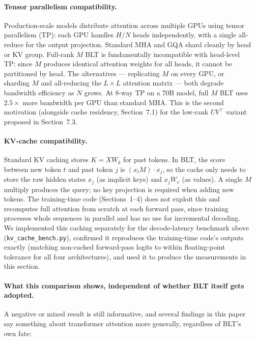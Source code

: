 \documentclass[11pt]{article}
\begin{document}
\paragraph{Tensor parallelism compatibility.} Production-scale models distribute attention across multiple GPUs using tensor parallelism (TP): each GPU handles $H/N$ heads independently, with a single all-reduce for the output projection. Standard MHA and GQA shard cleanly by head or KV group. Full-rank $M$ BLT is fundamentally incompatible with head-level TP: since $M$ produces identical attention weights for all heads, it cannot be partitioned by head. The alternatives --- replicating $M$ on every GPU, or sharding $M$ and all-reducing the $L\times L$ attention matrix --- both degrade bandwidth efficiency as $N$ grows. At 8-way TP on a 70B model, full $M$ BLT uses $2.5\times$ more bandwidth per GPU than standard MHA. This is the second motivation (alongside cache residency, Section~7.1) for the low-rank $UV^\top$ variant proposed in Section~7.3.

\paragraph{KV-cache compatibility.} Standard KV caching stores $K = XW_k$ for past tokens. In BLT, the score between new token $t$ and past token $j$ is $(x_t M)\cdot x_j$, so the cache only needs to store the raw hidden states $x_j$ (as implicit keys) and $x_j W_v$ (as values). A single $M$ multiply produces the query; no key projection is required when adding new tokens. The training-time code (Sections~1--4) does not exploit this and recomputes full attention from scratch at each forward pass, since training processes whole sequences in parallel and has no use for incremental decoding. We implemented this caching separately for the decode-latency benchmark above (\texttt{kv\_cache\_bench.py}), confirmed it reproduces the training-time code's outputs exactly (matching non-cached forward-pass logits to within floating-point tolerance for all four architectures), and used it to produce the measurements in this section.

\paragraph{What this comparison shows, independent of whether BLT itself gets adopted.} A negative or mixed result is still informative, and several findings in this paper say something about transformer attention more generally, regardless of BLT's own fate:
\end{document}
